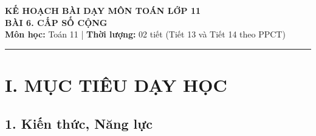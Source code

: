 \documentclass[12pt, a4paper]{article}
\begin{document}
\begin{center}
    {\Large \textbf{KẾ HOẠCH BÀI DẠY MÔN TOÁN LỚP 11}}\\[0.4em]
    {\LARGE \textbf{BÀI 6. CẤP SỐ CỘNG}}\\[0.5em]
    \textbf{Môn học:} Toán 11 | \textbf{Thời lượng:} 02 tiết (Tiết 13 và Tiết 14 theo PPCT)
\end{center}


\vspace{0.5em}
\hrule
\vspace{1em}


\section*{I. MỤC TIÊU DẠY HỌC}


\subsection*{1. Kiến thức, Năng lực}
\end{document}
